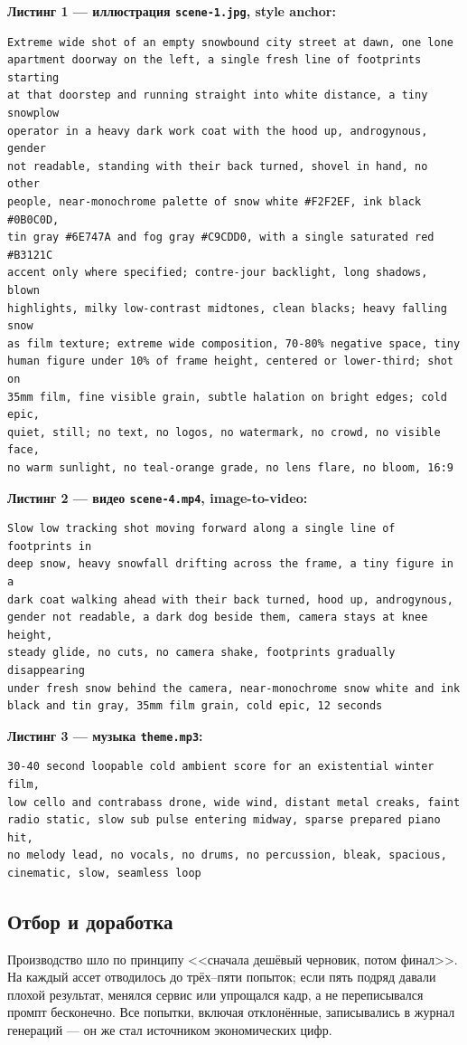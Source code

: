 \documentclass[12pt, a4paper]{article}
\begin{document}
\noindent\textbf{Листинг 1 --- иллюстрация \texttt{scene-1.jpg}, style anchor:}
{\scriptsize
\begin{verbatim}
Extreme wide shot of an empty snowbound city street at dawn, one lone
apartment doorway on the left, a single fresh line of footprints starting
at that doorstep and running straight into white distance, a tiny snowplow
operator in a heavy dark work coat with the hood up, androgynous, gender
not readable, standing with their back turned, shovel in hand, no other
people, near-monochrome palette of snow white #F2F2EF, ink black #0B0C0D,
tin gray #6E747A and fog gray #C9CDD0, with a single saturated red #B3121C
accent only where specified; contre-jour backlight, long shadows, blown
highlights, milky low-contrast midtones, clean blacks; heavy falling snow
as film texture; extreme wide composition, 70-80% negative space, tiny
human figure under 10% of frame height, centered or lower-third; shot on
35mm film, fine visible grain, subtle halation on bright edges; cold epic,
quiet, still; no text, no logos, no watermark, no crowd, no visible face,
no warm sunlight, no teal-orange grade, no lens flare, no bloom, 16:9
\end{verbatim}
}

\noindent\textbf{Листинг 2 --- видео \texttt{scene-4.mp4}, image-to-video:}
{\scriptsize
\begin{verbatim}
Slow low tracking shot moving forward along a single line of footprints in
deep snow, heavy snowfall drifting across the frame, a tiny figure in a
dark coat walking ahead with their back turned, hood up, androgynous,
gender not readable, a dark dog beside them, camera stays at knee height,
steady glide, no cuts, no camera shake, footprints gradually disappearing
under fresh snow behind the camera, near-monochrome snow white and ink
black and tin gray, 35mm film grain, cold epic, 12 seconds
\end{verbatim}
}

\noindent\textbf{Листинг 3 --- музыка \texttt{theme.mp3}:}
{\scriptsize
\begin{verbatim}
30-40 second loopable cold ambient score for an existential winter film,
low cello and contrabass drone, wide wind, distant metal creaks, faint
radio static, slow sub pulse entering midway, sparse prepared piano hit,
no melody lead, no vocals, no drums, no percussion, bleak, spacious,
cinematic, slow, seamless loop
\end{verbatim}
}

\subsection{Отбор и доработка}
Производство шло по принципу <<сначала дешёвый черновик, потом финал>>. На каждый ассет отводилось до трёх--пяти попыток; если пять подряд давали плохой результат, менялся сервис или упрощался кадр, а не переписывался промпт бесконечно. Все попытки, включая отклонённые, записывались в журнал генераций --- он же стал источником экономических цифр.
\end{document}
